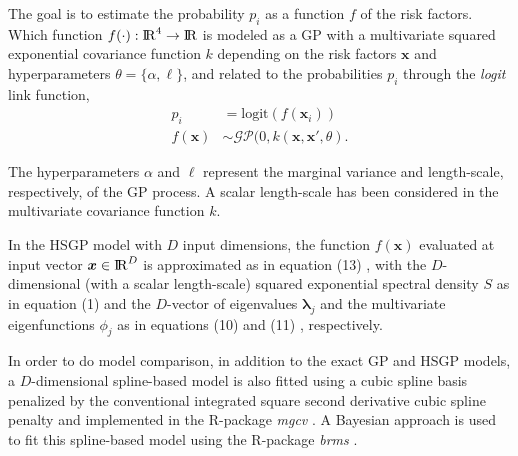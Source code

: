 \documentclass[onecolumn,a4paper,11pt]{article}
\begin{document}
\noindent The goal is to estimate the probability $p_i$ as a function $f$ of the risk factors. Which function $f(\cdot):{\rm I\!R}^{4} \to {\rm I\!R}$ is modeled as a GP with a multivariate squared exponential covariance function $k$ depending on the risk factors $\bm{x}$ and hyperparameters $\theta=\{\alpha,\ell\}$, and related to the probabilities $p_i$ through the {\it logit} link function,
%
\begin{align*} \label{ch5_eq_gpprior_gay}
p_i &= \mathrm{logit}(f(\bm{x}_i)) \nonumber \\
f(\bm{x}) &\sim \mathcal{GP}(0, k(\bm{x},\bm{x}', \theta).
\end{align*}

\noindent The hyperparameters $\alpha$ and $\ell$ represent the marginal variance and length-scale, respectively, of the GP process. A scalar length-scale has been considered in the multivariate covariance function $k$.

In the HSGP model with $D$ input dimensions, the function $f(\bm{x})$ evaluated at input vector $\bm{x} \in {\rm I\!R}^D$ is approximated as in equation (13)%
, with the $D$-dimensional (with a scalar length-scale) squared exponential spectral density $S$ as in equation (1) %
and the $D$-vector of eigenvalues $\bm{\lambda}_j$ and the multivariate eigenfunctions $\phi_j$ as in equations (10) %
and (11)%
, respectively.


In order to do model comparison, in addition to the exact GP and HSGP models, a $D$-dimensional spline-based model is also fitted using a cubic spline basis penalized by the conventional integrated square second derivative cubic spline penalty \citep{wood2017generalized} and implemented in the R-package \textit{mgcv} \citep{wood2011mgcv}. A Bayesian approach is used to fit this spline-based model using the R-package \textit{brms} \citep{burkner2017brms}.
\end{document}
